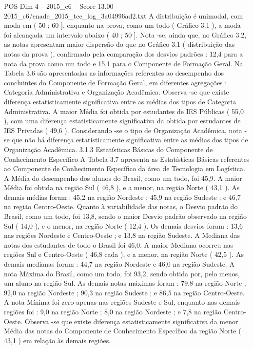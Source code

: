 \begin{textsample}{POS Dim 4 – 2015\_c6 – Score 13.00 – 2015\_c6/enade\_2015\_tec\_log\_3a04996ad2.txt}
A distribuição é unimodal, com moda em ( 50 ; 60 ], enquanto na prova, como um todo ( Gráfico 3.1 ), a moda foi alcançada um intervalo abaixo ( 40 ; 50 ].
Nota -se, ainda que, no Gráfico 3.2, as notas apresentam maior dispersão do que no Gráfico 3.1 ( distribuição das notas da prova ), confirmado pela comparação dos desvios padrões : 12,4 para a nota da prova como um todo e 15,1 para o Componente de Formação Geral.
Na Tabela 3.6 são apresentadas as informações referentes ao desempenho dos concluintes do Componente de Formação Geral, em diferentes agregações : Categoria Administrativa e Organização Acadêmica.
Observa -se que existe diferença estatisticamente significativa entre as médias dos tipos de Categoria Administrativa.
A maior Média foi obtida por estudantes de IES Públicas ( 55,0 ), com uma diferença estatisticamente significativa da obtida por estudantes de IES Privadas ( 49,6 ).
Considerando -se o tipo de Organização Acadêmica, nota -se que não há diferença estatisticamente significativa entre as médias dos tipos de Organização Acadêmica. 3.1.3 Estatísticas Básicas do Componente de Conhecimento Específico A Tabela 3.7 apresenta as Estatísticas Básicas referentes ao Componente de Conhecimento Específico da área de Tecnologia em Logística.
A Média do desempenho dos alunos do Brasil, como um todo, foi 45,9.
A maior Média foi obtida na região Sul ( 46,8 ), e a menor, na região Norte ( 43,1 ).
As demais médias foram : 45,2 na região Nordeste ; 45,9 na região Sudeste ; e 46,7 na região Centro-Oeste.
Quanto à variabilidade das notas, o Desvio padrão do Brasil, como um todo, foi 13,8, sendo o maior Desvio padrão observado na região Sul ( 14,0 ), e o menor, na região Norte ( 12,4 ).
Os demais desvios foram : 13,6 nas regiões Nordeste e Centro-Oeste ; e 13,8 na região Sudeste.
A Mediana das notas dos estudantes de todo o Brasil foi 46,0.
A maior Mediana ocorreu nas regiões Sul e Centro-Oeste ( 46,8 cada ), e a menor, na região Norte ( 42,5 ).
As demais medianas foram : 44,7 na região Nordeste e 46,0 na região Sudeste.
A nota Máxima do Brasil, como um todo, foi 93,2, sendo obtida por, pelo menos, um aluno na região Sul.
As demais notas máximas foram : 79,8 na região Norte ; 92,0 na região Nordeste ; 90,3 na região Sudeste ; e 86,5 na região Centro-Oeste.
A nota Mínima foi zero apenas nas regiões Sudeste e Sul, enquanto nas demais regiões foi : 9,0 na região Norte ; 8,0 na região Nordeste ; e 7,8 na região Centro-Oeste.
Observa -se que existe diferença estatisticamente significativa da menor Média das notas do Componente de Conhecimento Específico da região Norte ( 43,1 ) em relação às demais regiões.

\end{textsample}
